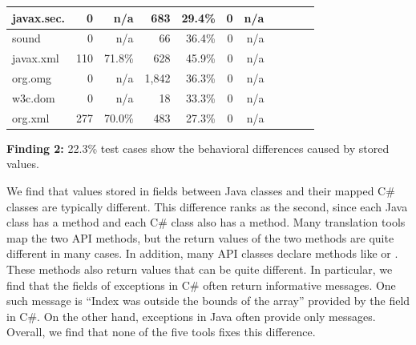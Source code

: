 \begin{table}[t]
\begin{SmallOut}
\begin {tabular} {|l|r|r|r|r|r|r|r|r|r|r|}
\hline
javax.sec.  &  0     &   n/a     & 683     & 29.4\%  &  0        & n/a\\
\hline
sound       &  0     &   n/a     & 66       & 36.4\%  &   0        &n/a  \\
\hline
javax.xml   &  110   &    71.8\%  &  628    & 45.9\%  &   0         & n/a\\
\hline
org.omg     &  0     &   n/a     & 1,842    & 36.3\%  & 0           & n/a  \\
\hline
w3c.dom     &  0     &   n/a     & 18      & 33.3\%  &  0         & n/a  \\
\hline
org.xml     &   277  &   70.0\%  & 483     & 27.3\%  & 0         & n/a\\
\hline
\end{tabular}%
 \label{table:packagetest}
\end{SmallOut}\vspace*{-6ex}
\end{table}

\textbf{Finding 2:} 22.3\% test cases show the behavioral differences caused by stored  values.

We find that  values stored in fields between Java classes and their mapped C\# classes are typically different. This difference ranks as the second, since each Java class has a  method and each C\# class also has a  method. Many translation tools map the two API methods, but the return values of the two methods are quite different in many cases. In addition, many API classes declare methods like  or . These methods also return  values that can be quite different. In particular, we find that the  fields of exceptions in C\# often return informative messages. One such message is ``Index was outside the bounds of the array'' provided by the  field in C\#. On the other hand, exceptions in Java often provide only  messages. Overall, we find that none of the five tools fixes this difference.


